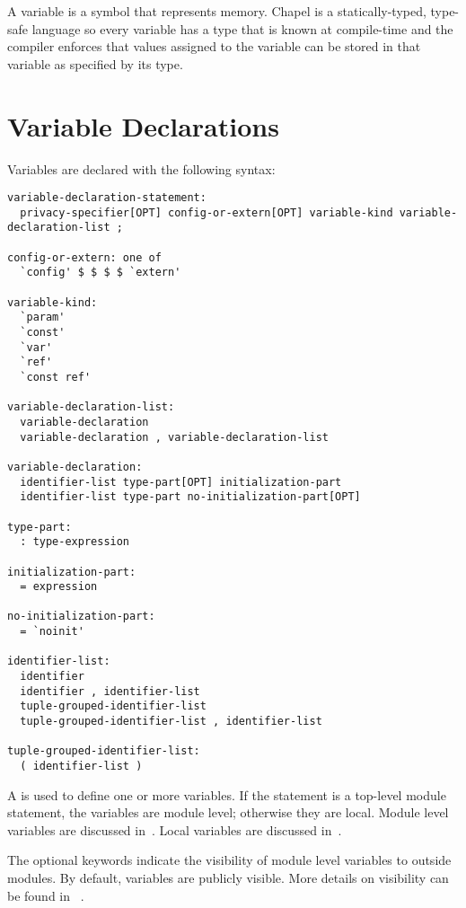 \label{Variables}

A variable is a symbol that represents memory.  Chapel is a
statically-typed, type-safe language so every variable has a type that
is known at compile-time and the compiler enforces that values
assigned to the variable can be stored in that variable as specified
by its type.

\section{Variable Declarations}
\label{Variable_Declarations}

Variables are declared with the following syntax:
\begin{syntax}
\begin{verbatim}
variable-declaration-statement:
  privacy-specifier[OPT] config-or-extern[OPT] variable-kind variable-declaration-list ;

config-or-extern: one of
  `config' $ $ $ $ `extern'

variable-kind:
  `param'
  `const'
  `var'
  `ref'
  `const ref'

variable-declaration-list:
  variable-declaration
  variable-declaration , variable-declaration-list

variable-declaration:
  identifier-list type-part[OPT] initialization-part
  identifier-list type-part no-initialization-part[OPT]

type-part:
  : type-expression

initialization-part:
  = expression

no-initialization-part:
  = `noinit'

identifier-list:
  identifier
  identifier , identifier-list
  tuple-grouped-identifier-list
  tuple-grouped-identifier-list , identifier-list

tuple-grouped-identifier-list:
  ( identifier-list )
\end{verbatim}
\end{syntax}
A  is used to define one or more
variables.  If the statement is a top-level module statement, the
variables are module level; otherwise they are local.  Module level variables are
discussed in~.  Local variables are discussed
in~.

The optional  keywords indicate the visibility
of module level variables to outside modules.  By default, variables
are publicly visible.  More details on visibility can be found in
~.

